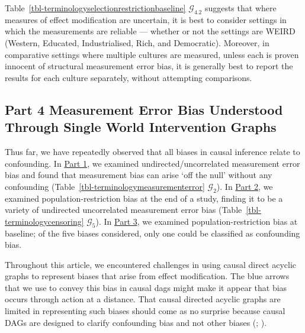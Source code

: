 \documentclass[
  single column]{article}
\begin{document}
Table~\ref{tbl-terminologyselectionrestrictionbaseline}
\(\mathcal{G}_{4.2}\) suggests that where measures of effect
modification are uncertain, it is best to consider settings in which the
measurements are reliable --- whether or not the settings are WEIRD
(Western, Educated, Industrialised, Rich, and Democratic). Moreover, in
comparative settings where multiple cultures are measured, unless each
is proven innocent of structural measurement error bias, it is generally
best to report the results for each culture separately, without
attempting comparisons.

\subsection{Part 4 Measurement Error Bias Understood Through Single
World Intervention Graphs}\label{id-sec-4}

Thus far, we have repeatedly observed that all biases in causal
inference relate to confounding. In \hyperref[id-sec-1]{Part 1}, we
examined undirected/uncorrelated measurement error bias and found that
measurement bias can arise `off the null' without any confounding
(Table~\ref{tbl-terminologymeasurementerror} \(\mathcal{G}_2\)). In
\hyperref[id-sec-2]{Part 2}, we examined population-restriction bias at
the end of a study, finding it to be a variety of undirected
uncorrelated measurement error bias
(Table~\ref{tbl-terminologycensoring} \(\mathcal{G}_5\)). In
\hyperref[id-sec-3]{Part 3}, we examined population-restriction bias at
baseline; of the five biases considered, only one could be classified as
confounding bias.

Throughout this article, we encountered challenges in using causal
direct acyclic graphs to represent biases that arise from effect
modification. The blue arrows that we use to convey this bias in causal
dags might make it appear that bias occurs through action at a distance.
That causal directed acyclic graphs are limited in representing such
biases should come as no surprise because causal DAGs are designed to
clarify confounding bias and not other biases
(;
).
\end{document}
